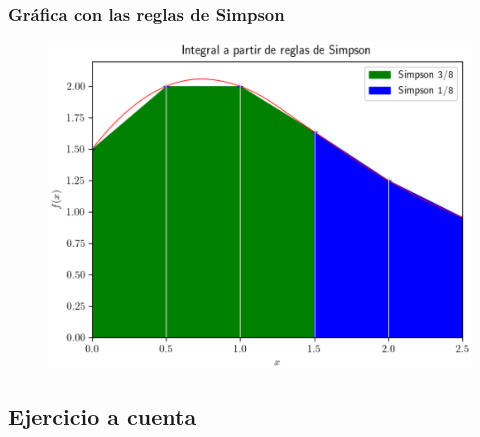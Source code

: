 \documentclass[12pt]{beamer}
\begin{document}
\begin{frame}
\frametitle{Gráfica con las reglas de Simpson}
\begin{figure}
	\centering
	\includegraphics[scale=0.55]{Imagenes/integracion_ejercicio_puntos_02.eps}
\end{figure}
\end{frame}

\subsection{Ejercicio a cuenta}
\end{document}
